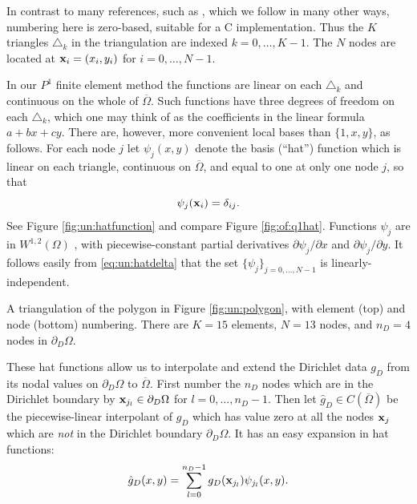 In contrast to many references, such as \citet{Elmanetal2005}, which we follow in many other ways, numbering here is zero-based, suitable for a C implementation.  Thus the $K$ triangles $\triangle_k$ in the triangulation are indexed $k=0,\dots,K-1$.  The $N$ nodes are located at $\mathbf{x}_i=(x_i,y_i)$ for $i=0,\dots,N-1$. 

In our $P^1$ finite element method the functions are linear on each $\triangle_k$ and continuous on the whole of $\overline\Omega$.  Such functions have three degrees of freedom on each $\triangle_k$, which one may think of as the coefficients in the linear formula $a + b x + c y$.  There are, however, more convenient local bases than $\{1,x,y\}$, as follows.  For each node $j$ let $\psi_j(x,y)$ denote the basis (``hat'') function which is linear on each triangle, continuous on $\overline{\Omega}$, and equal to one at only one node $j$, so that
\begin{equation}
\psi_j(\mathbf{x}_i) = \delta_{ij}.  \label{eq:un:hatdelta}
\end{equation}
See Figure \ref{fig:un:hatfunction} and compare Figure \ref{fig:of:q1hat}.  Functions $\psi_j$ are in $W^{1,2}(\Omega)$ \citep{Braess2007}, with piecewise-constant partial derivatives $\partial\psi_j/\partial x$ and $\partial\psi_j/\partial y$.  It follows easily from \eqref{eq:un:hatdelta} that the set $\{\psi_j\}_{j=0,\dots,N-1}$ is linearly-independent.

\begin{marginfigure}


\medskip


\caption{A triangulation of the polygon in Figure \ref{fig:un:polygon}, with element (top) and node (bottom) numbering.  There are $K=15$ elements, $N=13$ nodes, and $n_D=4$ nodes in $\partial_D\Omega$.}
\label{fig:un:number-mesh}
\end{marginfigure}

These hat functions allow us to interpolate and extend the Dirichlet data $g_D$ from its nodal values on $\partial_D \Omega$ to $\overline\Omega$.  First number the $n_D$ nodes which are in the Dirichlet boundary by $\mathbf{x}_{j_l} \in \partial_D\Omega$ for $l=0,\dots,n_D-1$.  Then let $\hat g_D \in C(\overline\Omega)$ be the piecewise-linear interpolant of $g_D$ which has value zero at all the nodes $\mathbf{x}_j$ which are \emph{not} in the Dirichlet boundary $\partial_D \Omega$.  It has an easy expansion in hat functions:
\begin{equation}
\hat g_D(x,y) = \sum_{l=0}^{n_D-1} g_D(\mathbf{x}_{j_l}) \psi_{j_l}(x,y). \label{eq:un:hatgdefine}
\end{equation}


